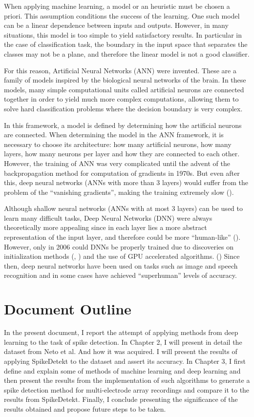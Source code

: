 When applying machine learning, a model or an heuristic must be chosen a priori. This assumption conditions the success of the learning. One such model can be a linear dependence between inputs and outputs. However, in many situations, this model is too simple to yield satisfactory results. In particular in the case of classification task, the boundary in the input space that separates the  classes may not be a plane, and therefore the linear model is not a good classifier.

For this reason, Artificial Neural Networks (ANN) were invented. These are a family of models inspired by the biological neural networks of the brain. In these models, many simple computational units called artificial neurons are connected together in order to yield much more complex computations, allowing them to solve hard classification problems where the decision boundary is very complex.

In this framework, a model is defined by determining how the artificial neurons are connected. When determining the model in the ANN framework, it is necessary to choose its architecture: how many artificial neurons, how many layers, how many neurons per layer and how they are connected to each other. However, the training of ANN was very complicated until the advent of the backpropagation method for computation of gradients in 1970s.  But even after this, deep neural networks (ANNs with more than 3 layers) would suffer from the problem of the “vanishing gradients”, making the training extremely slow (\cite{hochreiter2001gradient}).

Although shallow neural networks (ANNs with at most 3 layers) can be used to learn many difficult tasks, Deep Neural Networks (DNN) were always theoretically more appealing since in each layer lies a more abstract representation of the input layer, and therefore could be more “human-like” (\cite{rumelhart1988learning}). However, only in 2006 could DNNs be properly trained due to discoveries on initialization methods (\cite{hinton2006fast}, \cite{bengio2007greedy}) and the use of GPU accelerated algorithms. (\cite{raina2009large}) Since then, deep neural networks have been used on tasks such as image and speech recognition and in some cases have achieved “superhuman” levels of accuracy.

\section{Document Outline}
In the present document, I report the attempt of applying methods from deep learning to the task of spike detection. In Chapter 2, I will present in detail the dataset from Neto et al. And how it was acquired. I will present the results of applying SpikeDetekt to the dataset and assert its accuracy. In Chapter 3, I first define and explain some of methods of machine learning and deep learning and then present the results from the implementation of such algorithms to generate a spike detection method for multi-electrode array recordings and compare it to the results from SpikeDetekt. Finally, I conclude presenting the significance of the results obtained and propose future steps to be taken.

